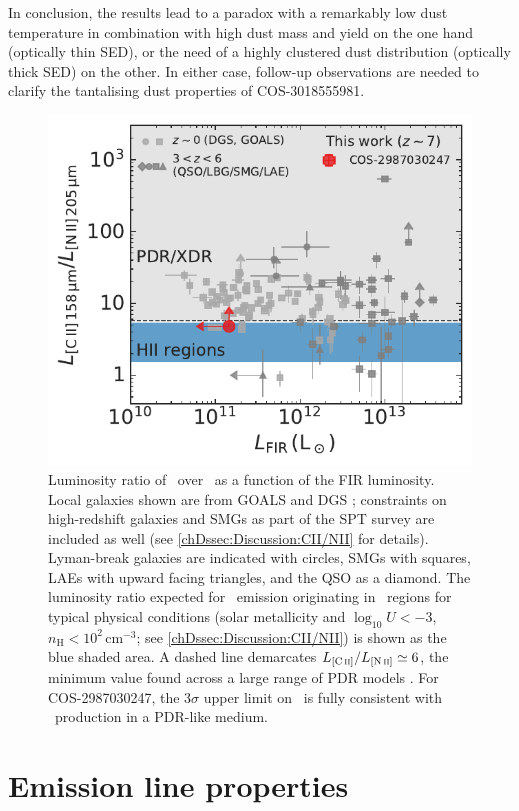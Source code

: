 In conclusion, the results lead to a paradox with a remarkably low dust temperature in combination with high dust mass and yield on the one hand (optically thin SED), or the need of a highly clustered dust distribution (optically thick SED) on the other. In either case, follow-up observations are needed to clarify the tantalising dust properties of COS-3018555981.
\begin{figure}[t]
    \centering
    \includegraphics[width=0.6\linewidth]{"Plots/ChapterD/CII_NII_ratio"}
    \caption[Luminosity ratio of \CII\ over \NII\ as a function of $L_\text{FIR}$.]{Luminosity ratio of \CIILam\ over \NIILam\ as a function of the FIR luminosity. Local galaxies shown are from GOALS \citep{2017ApJ...846...32D} and DGS \citep{2015A&A...578A..53C, 2019A&A...626A..23C}; constraints on high-redshift galaxies \citep{2014ApJ...782L..17D, 2016ApJ...832..151P, 2019ApJ...882..168P} and SMGs as part of the SPT survey \citep{2020MNRAS.494.4090C} are included as well (see \cref{chDssec:Discussion:CII/NII} for details). Lyman-break galaxies are indicated with circles, SMGs with squares, LAEs with upward facing triangles, and the QSO as a diamond. The luminosity ratio expected for \CII\ emission originating in \HII\ regions for typical physical conditions (solar metallicity and $\log_{10} U < -3$, $n_\text{H} < 10^2 \, \mathrm{cm^{-3}}$; see \cref{chDssec:Discussion:CII/NII}) is shown as the blue shaded area. A dashed line demarcates $L_\CII/L_\NII \simeq 6$, the minimum value found across a large range of PDR models \citep[grey shaded area; a similar neutral medium can be created in the presence of XDRs or shocked gas, see e.g.][]{2014ApJ...782L..17D}. For COS-2987030247, the $3 \sigma$ upper limit on \NII\ is fully consistent with \CII\ production in a PDR-like medium.
    }
    \label{chDfig:CII/NII_ratio}
\end{figure}

\section{Emission line properties}
\label{chDsec:Discussion:Emission_line_properties}

